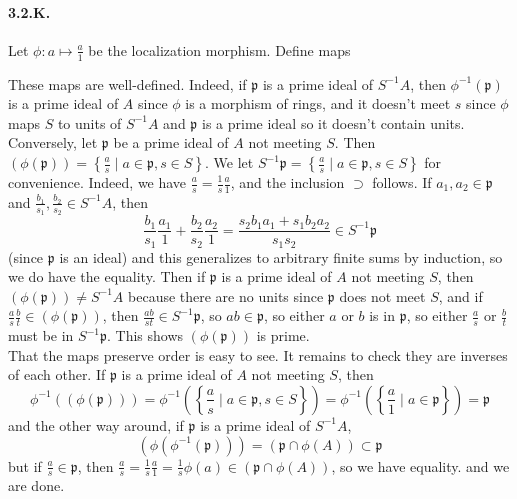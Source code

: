 \documentclass{article}
\newcommand{\p}{\mathfrak{p}}
\begin{document}
\paragraph{3.2.K.} Let $\phi : a \mapsto \frac{a}{1}$ be the localization morphism. Define maps
\begin{center}
\end{center}

These maps are well-defined. Indeed, if $\p$ is a prime ideal of $S^{-1}A$, then $\phi^{-1}(\p)$ is a prime ideal of $A$ since $\phi$ is a morphism of rings, and it doesn't meet $s$ since $\phi$ maps $S$ to units of $S^{-1}A$ and $\p$ is a prime ideal so it doesn't contain units. Conversely, let $\p$ be a prime ideal of $A$ not meeting $S$. Then $(\phi(\p)) = \left\{\frac{a}{s} \mid a \in \p, s\in S\right\}$. We let $S^{-1}\p = \left\{\frac{a}{s} \mid a \in \p, s\in S\right\}$ for convenience. Indeed, we have $\frac{a}{s} = \frac{1}{s}\frac{a}{1}$, and the inclusion $\supset$ follows. If $a_1,a_2 \in \p$ and $\frac{b_1}{s_1}, \frac{b_2}{s_2} \in S^{-1}A$, then
\[\frac{b_1}{s_1}\frac{a_1}{1} + \frac{b_2}{s_2}\frac{a_2}{1} = \frac{s_2 b_1 a_1 + s_1 b_2 a_2}{s_1 s_2} \in S^{-1}\p\]
(since $\p$ is an ideal) and this generalizes to arbitrary finite sums by induction, so we do have the equality. Then if $\p$ is a prime ideal of $A$ not meeting $S$, then $(\phi(\p)) \ne S^{-1}A$ because there are no units since $\p$ does not meet $S$, and if $\frac{a}{s} \frac{b}{t} \in (\phi(\p))$, then $\frac{ab}{st} \in S^{-1}\p$, so $ab \in \p$, so either $a$ or $b$ is in $\p$, so either $\frac{a}{s}$ or $\frac{b}{t}$ must be in $S^{-1}\p$. This shows $(\phi(\p))$ is prime. \\
That the maps preserve order is easy to see. It remains to check they are inverses of each other. If $\p$ is a prime ideal of $A$ not meeting $S$, then
\[\phi^{-1}((\phi(\p))) = \phi^{-1}\left(\left\{\frac{a}{s} \mid a \in \p, s\in S\right\}\right) = \phi^{-1}\left(\left\{\frac{a}{1} \mid a \in \p\right\}\right) = \p\]
and the other way around, if $\p$ is a prime ideal of $S^{-1}A$,
\[(\phi(\phi^{-1}(\p))) = (\p \cap \phi(A)) \subset \p\]
but if $\frac{a}{s} \in \p$, then $\frac{a}{s} = \frac{1}{s} \frac{a}{1} = \frac{1}{s} \phi(a) \in (\p \cap \phi(A))$, so we have equality.
and we are done.
\end{document}
